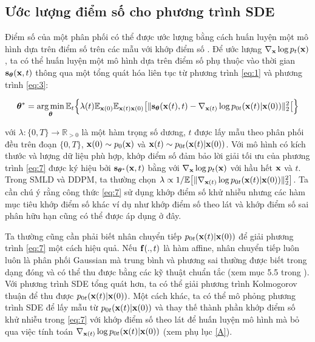 \documentclass{article} %
\begin{document}
\subsection{Ước lượng điểm số cho phương trình SDE} \label{Estimating-Scores-For-The-SDE}

Điểm số của một phân phối có thể được ước lượng bằng cách huấn luyện một mô hình dựa trên điểm số trên các mẫu với khớp điểm số \citep{hyvarinen2005estimation,song2020sliced}. Để ước lượng $\nabla_{\bold{x}} \log p_t(\bold{x})$, ta có thể huấn luyện một mô hình dựa trên điểm số phụ thuộc vào thời gian $\bold{s}_{\boldsymbol{\theta}}(\bold{x}, t)$ thông qua một tổng quát hóa liên tục từ phương trình \ref{eq:1} và phương trình \ref{eq:3}:

\begin{equation} \label{eq:7}
    \boldsymbol{\theta}^{\ast} = \operatorname*{arg\,min}_{\boldsymbol{\theta}} \mathbb{E}_t \Big \lbrace  \lambda(t) \mathbb{E}_{\bold{x}(0)} \mathbb{E}_{\bold{x}(t) \bold{x}(0)} \big \lbrack \lVert \bold{s}_{\boldsymbol{\theta}} (\bold{x}(t), t) - \nabla_{\bold{x}(t)} \log p_{0t} (\bold{x}(t) \vert \bold{x}(0)) \rVert_2^2 \big \lbrack \Big \rbrace
\end{equation}

với $\lambda: \lbrace 0, T \rbrace \rightarrow \mathbb{R}_{>0}$ là một hàm trọng số dương,
$t$ được lấy mẫu theo phân phối đều trên đoạn $\lbrace 0, T \rbrace$, $\bold{x}(0) \sim p_0 (\bold{x})$ và $\bold{x}(t) \sim p_{0t} (\bold{x}(t) \vert \bold{x}(0))$.
Với mô hình có kích thước và lượng dữ liệu phù hợp, khớp điểm số đảm bảo lời giải tối ưu của phương trình \ref{eq:7} được ký hiệu bởi $\bold{s}_{\boldsymbol{\theta}^{\ast}}(\bold{x}, t)$ bằng với $\nabla_{\bold{x}} \log p_t (\bold{x})$ với hầu hết $\bold{x}$ và $t$.
Trong SMLD và DDPM, ta thường chọn $\lambda \propto 1 / \mathbb{E} \big \lbrack \lVert \nabla_{\bold{x}(t)} \log p_{0t} (\bold{x}(t) \vert \bold{x}(0)) \rVert_2^2 \big \rbrack$.
Ta cần chú ý rằng công thức \ref{eq:7} sử dụng khớp điểm số khử nhiễu nhưng các hàm mục tiêu khớp điểm số khác ví dụ như khớp điểm số theo lát \citep{song2020sliced} và khớp điểm số sai phân hữu hạn \citep{pang2020efficient} cũng có thể được áp dụng ở đây.

Ta thường cũng cần phải biết nhân chuyển tiếp $p_{0t} (\bold{x}(t) \vert \bold{x}(0))$ để giải phương trình \ref{eq:7} một cách hiệu quả.
Nếu $\bold{f}(.,t)$ là hàm affine, nhân chuyển tiếp luôn luôn là phân phối Gaussian mà trung bình và phương sai thường được biết trong dạng đóng và có thể thu được bằng các kỹ thuật chuẩn tắc (xem mục 5.5  trong \cite{sarkka2019applied}).
Với phương trình SDE tổng quát hơn, ta có thể giải phương trình Kolmogorov thuận \citep{oksendal2003stochastic} để thu được $p_{0t} (\bold{x}(t) \vert \bold{x}(0))$.
Một cách khác, ta có thể mô phỏng phương trình SDE để lấy mẫu từ $p_{0t}(\bold{x}(t) \vert \bold{x}(0))$ và thay thế thành phần khớp điểm số khử nhiễu trong \ref{eq:7} với khớp điểm số theo lát để huấn luyện mô hình mà bỏ qua việc tính toán $\nabla_{\bold{x}(t)} \log p_{0t} (\bold{x}(t) \vert \bold{x}(0))$ (xem phụ lục \ref{A}).
\end{document}
